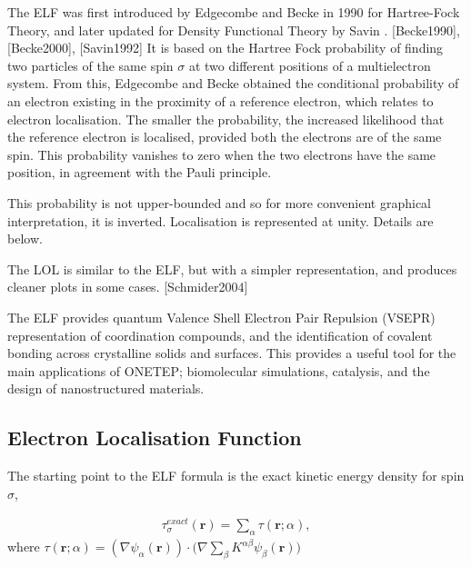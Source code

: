 \documentclass[letterpaper,10pt,english]{sphinxmanual}
\begin{document}
The ELF was first introduced by Edgecombe and Becke in 1990 for
Hartree-Fock Theory, and later updated for Density Functional Theory by
Savin .
{[}Becke1990{]}, {[}Becke2000{]}, {[}Savin1992{]} It is based
on the Hartree Fock probability of finding two particles of the same
spin \(\sigma\) at two different positions of a multielectron
system. From this, Edgecombe and Becke obtained the conditional
probability of an electron existing in the proximity of a reference
electron, which relates to electron localisation. The smaller the
probability, the increased likelihood that the reference electron is
localised, provided both the electrons are of the same spin. This
probability vanishes to zero when the two electrons have the same
position, in agreement with the Pauli principle.

This probability is not upper-bounded and so for more convenient
graphical interpretation, it is inverted. Localisation is represented at
unity. Details are below.

The LOL is similar to the ELF, but with a simpler representation, and produces cleaner plots in some cases. {[}Schmider2004{]}

The ELF provides quantum Valence Shell Electron Pair Repulsion (VSEPR)
representation of coordination compounds, and the identification of
covalent bonding across crystalline solids and surfaces. This provides a
useful tool for the main applications of ONETEP; biomolecular
simulations, catalysis, and the design of nanostructured materials.


\subsection{Electron Localisation Function}
\label{\detokenize{eld:electron-localisation-function}}
The starting point to the ELF formula is the exact kinetic energy
density for spin \(\sigma\),

\label{\detokenize{eld:equation-kedensity}}\begin{equation}\label{equation:eld:kedensity}
\begin{split}\tau_{\sigma}^{exact}(\textbf{r}) = \sum_{\alpha} \tau(\textbf{r};\alpha),\end{split}
\end{equation}
where
\(\tau(\textbf{r};\alpha)=(\nabla \psi_{\alpha}(\textbf{r})) \cdot \bigg( \nabla \sum_{\beta}K^{\alpha\beta}\psi_{\beta}(\textbf{r}) \bigg)\)
\end{document}
